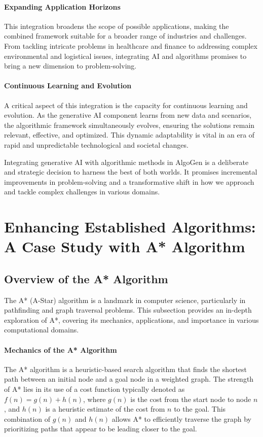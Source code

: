 \documentclass{article}
\begin{document}
\paragraph{Expanding Application Horizons}
This integration broadens the scope of possible applications, making the combined framework suitable for a broader range of industries and challenges. From tackling intricate problems in healthcare and finance to addressing complex environmental and logistical issues, integrating AI and algorithms promises to bring a new dimension to problem-solving.

\paragraph{Continuous Learning and Evolution}
A critical aspect of this integration is the capacity for continuous learning and evolution. As the generative AI component learns from new data and scenarios, the algorithmic framework simultaneously evolves, ensuring the solutions remain relevant, effective, and optimized. This dynamic adaptability is vital in an era of rapid and unpredictable technological and societal changes.

Integrating generative AI with algorithmic methods in AlgoGen is a deliberate and strategic decision to harness the best of both worlds. It promises incremental improvements in problem-solving and a transformative shift in how we approach and tackle complex challenges in various domains.



\section{Enhancing Established Algorithms: A Case Study with A* Algorithm}

\subsection{Overview of the A* Algorithm}

The A* (A-Star) algorithm is a landmark in computer science, particularly in pathfinding and graph traversal problems. This subsection provides an in-depth exploration of A*, covering its mechanics, applications, and importance in various computational domains.

\paragraph{Mechanics of the A* Algorithm}
The A* algorithm is a heuristic-based search algorithm that finds the shortest path between an initial node and a goal node in a weighted graph. The strength of A* lies in its use of a cost function typically denoted as $f\left(n\right) = g\left(n\right) + h\left(n\right)$, where $g\left(n\right)$ is the cost from the start node to node $n$, and $h\left(n\right)$ is a heuristic estimate of the cost from $n$ to the goal. This combination of $g\left(n\right)$ and $h\left(n\right)$ allows A* to efficiently traverse the graph by prioritizing paths that appear to be leading closer to the goal.
\end{document}
